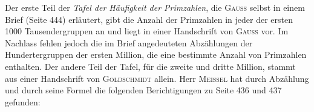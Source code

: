 \par Der erste Teil der \textit{Tafel der Häufigkeit der Primzahlen}, die \textsc{Gauss} selbst in einem Brief (Seite 444) erläutert, gibt die Anzahl der Primzahlen in jeder der ersten 1000 Tausendergruppen an und liegt in einer Handschrift von \textsc{Gauss} vor. Im Nachlass fehlen jedoch die im Brief angedeuteten Abzählungen der Hundertergruppen der ersten Million, die eine bestimmte Anzahl von Primzahlen enthalten. Der andere Teil der Tafel, für die zweite und dritte Million, stammt aus einer Handschrift von \textsc{Goldschmidt} allein. Herr \textsc{Meissel} hat durch Abzählung und durch seine Formel die folgenden Berichtigungen zu Seite 436 und 437 gefunden:
